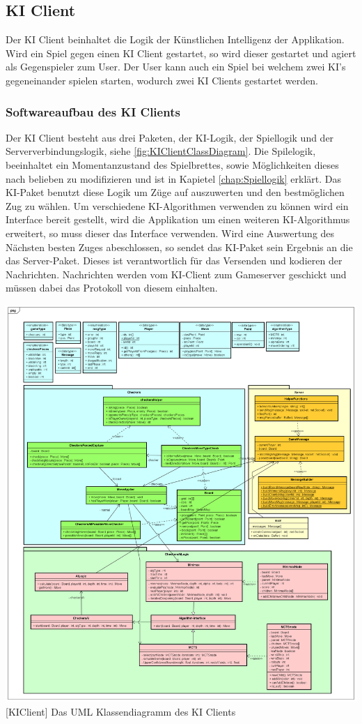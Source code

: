 \documentclass[12pt,a4paper,bibliography=totocnumbered,listof=totocnumbered]{article}
\begin{document}
\subsection{KI Client}
Der KI Client beinhaltet die Logik der Künstlichen Intelligenz der Applikation. Wird ein Spiel gegen einen KI Client gestartet, so wird dieser gestartet und agiert als 
Gegenspieler zum User. Der User kann auch ein Spiel bei welchem zwei KI's gegeneinander spielen starten, wodurch zwei KI Clients gestartet werden.

\subsubsection{Softwareaufbau des KI Clients}
Der KI Client besteht aus drei Paketen, der KI-Logik, der Spiellogik und der Serververbindungslogik, siehe \ref{fig:KIClientClassDiagram}. 
Die Spilelogik, beeinhaltet ein Momentanzustand des Spielbrettes, sowie Möglichkeiten dieses nach belieben zu modifizieren und ist in Kapietel 
\ref{chap:Spiellogik} erklärt. Das KI-Paket benutzt diese Logik um 
Züge auf auszuwerten und den bestmöglichen Zug zu wählen. Um verschiedene KI-Algorithmen verwenden zu können wird ein Interface bereit gestellt, wird die Applikation 
um einen weiteren KI-Algorithmus erweitert, so muss dieser das Interface verwenden. Wird eine Auswertung des Nächsten besten Zuges abeschlossen, so sendet das KI-Paket sein
Ergebnis an die das Server-Paket. Dieses ist verantwortlich für das Versenden und kodieren der Nachrichten. Nachrichten werden vom KI-Client zum Gameserver geschickt und müssen
dabei das Protokoll von diesem einhalten.

\vspace{1em}
\begin{minipage}{\linewidth}
	\centering
	\includegraphics[width=0.9\linewidth]{pics/GameClientClassDiagram.png}
	[KIClient]{ Das UML Klassendiagramm des KI Clients }
	\label{fig:KIClientClassDiagram}
\end{minipage}
\end{document}
